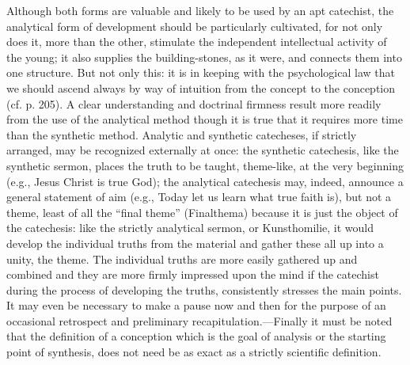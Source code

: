 Although both forms are valuable and likely to be used by an apt catechist, the analytical form of development should be particularly cultivated, for not only does it, more than the other, stimulate the independent intellectual activity of the young; it also supplies the building-stones, as it were, and connects them into one structure. But not only this: it is in keeping with the psychological law that we should ascend always by way of intuition from the concept to the conception (cf. p. 205). A clear understanding and doctrinal firmness result more readily from the use of the analytical method though it is true that it requires more time than the synthetic method. Analytic and synthetic catecheses, if strictly arranged, may be recognized externally at once: the synthetic catechesis, like the synthetic sermon, places the truth to be taught, theme-like, at the very beginning (e.g., Jesus Christ is true God); the analytical catechesis may, indeed, announce a general statement of aim (e.g., Today let us learn what true faith is), but not a theme, least of all the “final theme” (Finalthema) because it is just the object of the catechesis: like the strictly analytical sermon, or Kunsthomilie, it would develop the individual truths from the material and gather these all up into a unity, the theme. The individual truths are more easily gathered up and combined
and they are more firmly impressed upon the mind if the catechist during the process of developing the truths, consistently stresses the main points. It may even be necessary to make a pause now and then for the purpose of an occasional retrospect and preliminary recapitulation.—Finally it must be noted that the definition of a conception which is the goal of analysis or the starting point of synthesis, does not need be as exact as a strictly scientific definition.

